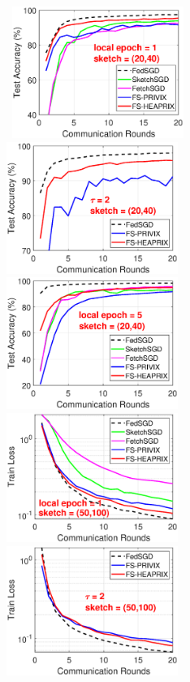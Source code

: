 \documentclass[11pt]{article}
\begin{document}
\begin{figure}[h]
\begin{center}
		\mbox{%
		\includegraphics[width=2.2in]{MNIST_figures/local1_sketch20_iid1_test_acc.eps} %
		\includegraphics[width=2.2in]{MNIST_figures/local2_sketch20_iid1_test_acc.eps} %
		\includegraphics[width=2.2in]{MNIST_figures/local5_sketch20_iid1_test_acc.eps}%
		}
		\mbox{%
		\includegraphics[width=2.2in]{MNIST_figures/local1_sketch50_iid1_train_loss.eps}%
		\includegraphics[width=2.2in]{MNIST_figures/local2_sketch50_iid1_train_loss.eps} %
}
\end{center}
\end{figure}
\end{document}
